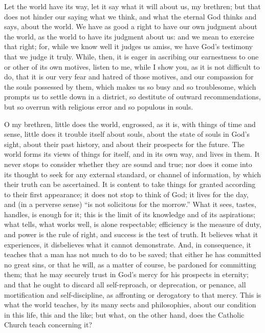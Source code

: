 Let the world have its way, let it say what it will about us, my
brethren; but that does not hinder our saying what we think, and what
the eternal God thinks and says, about the world. We have as good a
right to have our own judgment about the world, as the world to have
its judgment about us: and we mean to exercise that right; for, while
we know well it judges us amiss, we have God's testimony that we judge
it truly. While, then, it is eager in ascribing our earnestness to one
or other of its own motives, listen to me, while I show you, as it is
not difficult to do, that it is our very fear and hatred of those
motives, and our compassion for the souls possessed by them, which
makes us so busy and so troublesome, which prompts us to settle down
in a district, so destitute of outward recommendations, but so overrun
with religious error and so populous in souls.

O my brethren, little does the world, engrossed, as it is, with
things of time and sense, little does it trouble itself about souls,
about the state of souls in God's sight, about their past history, and
about their prospects for the future. The world forms its views of
things for itself, and in its own way, and lives in them. It never
stops to consider whether they are sound and true; nor does it come
into its thought to seek for any external standard, or channel of
information, by which their truth can be ascertained. It is content to
take things for granted according to their first appearance; it does
not stop to think of God; it lives for the day, and (in a perverse
sense) ``is not solicitous for the morrow.'' What it sees,
tastes, handles, is enough for it; this is the limit of its knowledge
and of its aspirations; what tells, what works well, is alone
respectable; efficiency is the measure of duty, and power is the rule
of right, and success is the test of truth. It believes what it
experiences, it disbelieves what it cannot demonstrate. And, in
consequence, it teaches that a man has not much to do to be saved;
that either he has committed no great sins, or that he will, as a
matter of course, be pardoned for committing them; that he may
securely trust in God's mercy for his prospects in eternity; and that
he ought to discard all self-reproach, or deprecation, or penance, all
mortification and self-discipline, as affronting or derogatory to that
mercy. This is what the world teaches, by its many sects and
philosophies, about our condition in this life, this and the like; but
what, on the other hand, does the Catholic Church teach concerning it?

